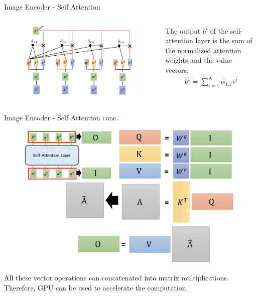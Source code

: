 \documentclass[aspectratio=169,xcolor=dvipsnames]{beamer}
\begin{document}
\begin{frame}{Image Encoder - Self Attention}
    \begin{columns}
        \begin{column}{0.6\textwidth}
            \begin{figure}
                \centering
                \includegraphics[width=1\linewidth]{figures/self_attention_summing.png}
                \label{self_attention_summing}
            \end{figure}
        \end{column}
        \begin{column}{0.4\textwidth}
            The output $b^i$ of the self-attention layer is the sum of the normalized attention weights and the value vectors:
            \begin{align*}
                b^1 = \sum\nolimits_{i=1}^{N} \hat{\alpha}_{1,i}v^i
            \end{align*}
        \end{column}
    \end{columns}
\end{frame}


\begin{frame}{Image Encoder - Self Attention conc.}
    \begin{figure}
        \centering
        \includegraphics[width=0.6\linewidth]{figures/self_attention_matrix_multiplication.png}
        \label{self_attention_matrix_multiplication}
    \end{figure}
    All these vector operations can concatenated into matrix multiplications. Therefore, GPU can be used to accelerate the computation.\\


\end{frame}
\end{document}
